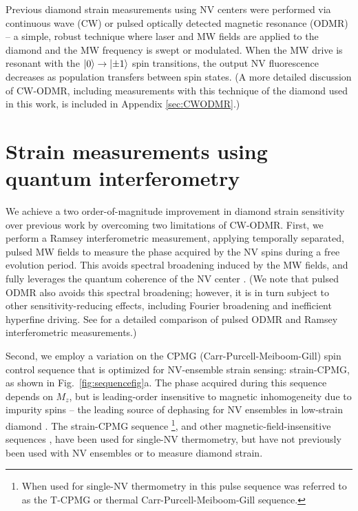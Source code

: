 \documentclass[reprint,superscriptaddress,hyphens,amsmath,amssymb,aps,prx,float]{revtex4-2}
\begin{document}
Previous diamond strain measurements using NV centers were performed via continuous wave (CW) \cite{StrainPaper,EnglundStrain2016,HoAnvilCells2020,HoAmorphousSolids2021} or pulsed \cite{AusStrain2019} optically detected magnetic resonance (ODMR) -- a simple, robust technique where laser and MW fields are applied to the diamond and the MW frequency is swept or modulated.  When the MW drive is resonant with the $\ket{0}\rightarrow\ket{\pm1}$ spin transitions, the output NV fluorescence decreases as population transfers between spin states.  (A more detailed discussion of CW-ODMR, including measurements with this technique of the diamond used in this work, is included in Appendix \ref{sec:CWODMR}.)

\section{Strain measurements using quantum interferometry}

We achieve a two order-of-magnitude improvement in diamond strain sensitivity over previous work by overcoming two limitations of CW-ODMR.  First, we perform a Ramsey interferometric measurement, applying temporally separated, pulsed MW fields to measure the phase acquired by the NV spins during a free evolution period.  This avoids spectral broadening induced by the MW fields, and fully leverages the quantum coherence of the NV center \cite{SensitivityReport,DegenQuantumSensing2017}.  (We note that pulsed ODMR also avoids this spectral broadening; however, it is in turn subject to other sensitivity-reducing effects, including Fourier broadening and inefficient hyperfine driving.  See \cite{SensitivityReport} for a detailed comparison of pulsed ODMR and Ramsey interferometric measurements.)

Second, we employ a variation on the CPMG (Carr-Purcell-Meiboom-Gill) spin control sequence that is optimized for NV-ensemble strain sensing: strain-CPMG, as shown in Fig.~\ref{fig:sequencefig}a.  The phase acquired during this sequence depends on $M_z$, but is leading-order insensitive to magnetic inhomogeneity due to impurity spins -- the leading source of dephasing for NV ensembles in low-strain diamond \cite{BauchDecoherence2020}.  The strain-CPMG sequence \cite{AwschalomThermometry2013,WangThermometry2015} \footnote{When used for single-NV thermometry in \cite{AwschalomThermometry2013,WangThermometry2015} this pulse sequence was referred to as the T-CPMG or thermal Carr-Purcell-Meiboom-Gill sequence.}, and other magnetic-field-insensitive sequences \cite{WrachtrupThermometry2013,KonzelmannCoopDRamsey2018}, have been used for single-NV thermometry, but have not previously been used with NV ensembles or to measure diamond strain.
\end{document}
